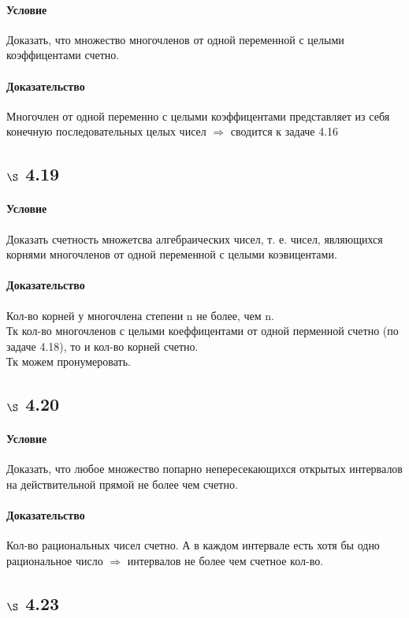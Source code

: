 \documentclass[a4paper,12pt]{article}
\begin{document}
\paragraph*{Условие}
Доказать, что множество многочленов от одной переменной с целыми коэффицентами счетно.
\paragraph*{Доказательство}
Многочлен от одной переменно с целыми коэффицентами представляет из себя конечную последовательных целых чисел $\Rightarrow$ сводится к задаче 4.16

\subsection*{$\S$ 4.19}
\paragraph*{Условие}
Доказать счетность множетсва алгебраических чисел, т. е. чисел, являющихся корнями многочленов от одной переменной с целыми коэвицентами.
\paragraph*{Доказательство}
Кол-во корней у многочлена степени n не более, чем n.\\
Тк кол-во многочленов с целыми коеффицентами от одной перменной счетно (по задаче 4.18), то и кол-во корней счетно.\\
Тк можем пронумеровать.

\subsection*{$\S$ 4.20}
\paragraph*{Условие}
Доказать, что любое множество попарно непересекающихся открытых интервалов на действительной прямой не более чем счетно.
\paragraph*{Доказательство}
Кол-во рациональных чисел счетно. А в каждом интервале есть хотя бы одно рациональное число $\Rightarrow$ интервалов не более чем счетное кол-во.

\subsection*{$\S$ 4.23}
\end{document}
